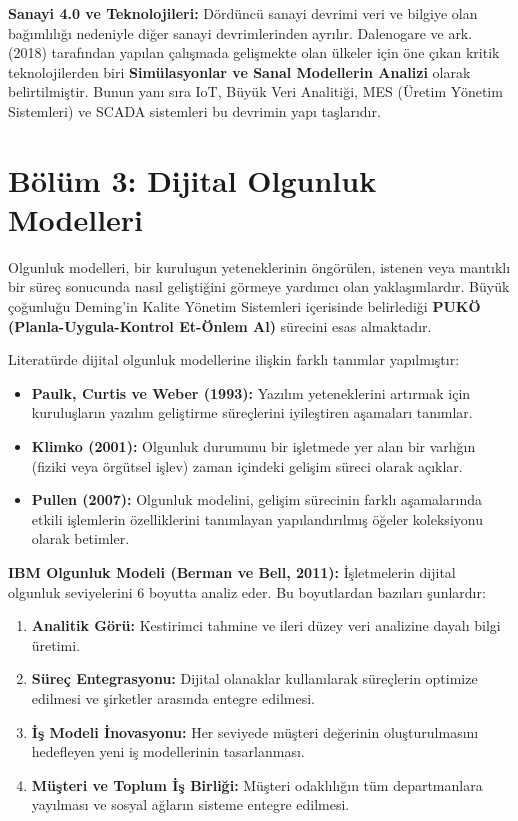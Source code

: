 \documentclass[11pt,a4paper,openany]{book}
\begin{document}
\textbf{Sanayi 4.0 ve Teknolojileri:} Dördüncü sanayi devrimi veri ve bilgiye olan bağımlılığı nedeniyle diğer sanayi devrimlerinden ayrılır. Dalenogare ve ark. (2018) tarafından yapılan çalışmada gelişmekte olan ülkeler için öne çıkan kritik teknolojilerden biri \textbf{Simülasyonlar ve Sanal Modellerin Analizi} olarak belirtilmiştir. Bunun yanı sıra IoT, Büyük Veri Analitiği, MES (Üretim Yönetim Sistemleri) ve SCADA sistemleri bu devrimin yapı taşlarıdır.

\needspace{9cm}
\section{Bölüm 3: Dijital Olgunluk Modelleri}
Olgunluk modelleri, bir kuruluşun yeteneklerinin öngörülen, istenen veya mantıklı bir süreç sonucunda nasıl geliştiğini görmeye yardımcı olan yaklaşımlardır. Büyük çoğunluğu Deming'in Kalite Yönetim Sistemleri içerisinde belirlediği \textbf{PUKÖ (Planla-Uygula-Kontrol Et-Önlem Al)} sürecini esas almaktadır.

Literatürde dijital olgunluk modellerine ilişkin farklı tanımlar yapılmıştır:
\begin{itemize}
    \item \textbf{Paulk, Curtis ve Weber (1993):} Yazılım yeteneklerini artırmak için kuruluşların yazılım geliştirme süreçlerini iyileştiren aşamaları tanımlar.
    \item \textbf{Klimko (2001):} Olgunluk durumunu bir işletmede yer alan bir varlığın (fiziki veya örgütsel işlev) zaman içindeki gelişim süreci olarak açıklar.
    \item \textbf{Pullen (2007):} Olgunluk modelini, gelişim sürecinin farklı aşamalarında etkili işlemlerin özelliklerini tanımlayan yapılandırılmış öğeler koleksiyonu olarak betimler.
\end{itemize}

\textbf{IBM Olgunluk Modeli (Berman ve Bell, 2011):} İşletmelerin dijital olgunluk seviyelerini 6 boyutta analiz eder. Bu boyutlardan bazıları şunlardır:
\begin{enumerate}
    \item \textbf{Analitik Görü:} Kestirimci tahmine ve ileri düzey veri analizine dayalı bilgi üretimi.
    \item \textbf{Süreç Entegrasyonu:} Dijital olanaklar kullanılarak süreçlerin optimize edilmesi ve şirketler arasında entegre edilmesi.
    \item \textbf{İş Modeli İnovasyonu:} Her seviyede müşteri değerinin oluşturulmasını hedefleyen yeni iş modellerinin tasarlanması.
    \item \textbf{Müşteri ve Toplum İş Birliği:} Müşteri odaklılığın tüm departmanlara yayılması ve sosyal ağların sisteme entegre edilmesi.
\end{enumerate}
\end{document}
